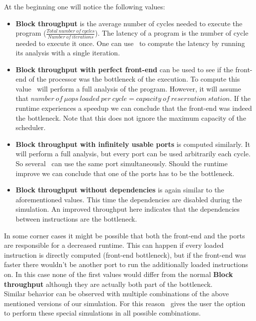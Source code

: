 At the beginning one will notice the following values:
\begin{itemize}
    \item \textbf{Block throughput} is the average number of cycles needed to execute the program ($\frac{Total\ number\ of\ cycles}{Number\ of\ iterations}$).
    The latency of a program is the number of cycle needed to execute it once. One can use \suaca\ to compute the latency by running its analysis with a single iteration.
    \item \textbf{Block throughput with perfect front-end} can be used to see if the front-end of the processor was the bottleneck of the execution. To compute this value \suaca\ will perform a full analysis of the program. However, it will assume that $number\ of\ \mu ops\ loaded\ per\ cycle = capacity\ of\ reservation\ station$. If the runtime experiences a speedup we can conclude that the front-end was indeed the bottleneck. Note that this does not ignore the maximum capacity of the scheduler.
    \item \textbf{Block throughput with infinitely usable ports} is computed similarly. It will perform a full analysis, but every port can be used arbitrarily each cycle. So several \microops\ can use the same port simultaneously. Should the runtime improve we can conclude that one of the ports has to be the bottleneck.
    \item \textbf{Block throughput without dependencies} is again similar to the aforementioned values. This time the dependencies are disabled during the simulation. An improved throughput here indicates that the dependencies between instructions are the bottleneck. 
\end{itemize}

In some corner cases it might be possible that both the front-end and the ports are responsible for a decreased runtime. This can happen if every loaded instruction is directly computed (front-end bottleneck), but if the front-end was faster there wouldn't be another port to run the additionally loaded instructions on. In this case none of the first values would differ from the normal \textbf{Block throughput} although they are actually both part of the bottleneck.\\
Similar behavior can be observed with multiple combinations of the above mentioned versions of our simulation. For this reason \suaca\ gives the user the option to perform these special simulations in all possible combinations.\\


